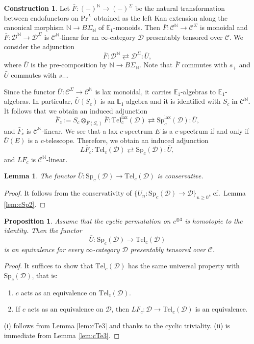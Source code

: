 \documentclass{amsart}
\theoremstyle{plain}
\newtheorem{proposition}[theorem]{Proposition}
\newtheorem{lemma}[theorem]{Lemma}
\theoremstyle{definition}
\newtheorem{construction}[theorem]{Construction}
\theoremstyle{remark}
\numberwithin{equation}{theorem}
\newcommand{\mcal}[1]{\mathcal{#1}}
\newcommand{\mbb}[1]{\mathbb{#1}}
\renewcommand{\Pr}{\mathrm{Pr}}
\newcommand{\Sp}{\mathrm{Sp}}
\newcommand{\Tel}{\mathrm{Tel}}
\newcommand{\lax}{\mathrm{lax}}
\begin{document}
\begin{construction}\label{cons:CST}
Let $\bar{F}\colon(-)^\mbb{N}\to(-)^\Sigma$ be the natural transformation between endofunctors on $\Pr^L$ obtained as the left Kan extension along the canonical morphism $\mbb{N}\to B\Sigma_\mbb{N}$ of $\mbb{E}_1$-monoids.
Then $\bar{F}\colon\mcal{C}^\mbb{N}\to\mcal{C}^\Sigma$ is monoidal and $\bar{F}\colon\mcal{D}^\mbb{N}\to\mcal{D}^\Sigma$ is $\mcal{C}^\mbb{N}$-linear for an $\infty$-category $\mcal{D}$ presentably tensored over $\mcal{C}$.
We consider the adjunction
\[
	\bar{F} \colon \mcal{D}^\mbb{N} \rightleftarrows \mcal{D}^\Sigma \colon \bar{U},
\]
where $\bar{U}$ is the pre-composition by $\mbb{N}\to B\Sigma_\mbb{N}$.
Note that $\bar{F}$ commutes with $s_+$ and $\bar{U}$ commutes with $s_-$.

Since the functor $\bar{U}\colon\mcal{C}^\Sigma\to\mcal{C}^\mbb{N}$ is lax monoidal, it carries $\mbb{E}_1$-algebras to $\mbb{E}_1$-algebras.
In particular, $\bar{U}(S_c)$ is an $\mbb{E}_1$-algebra and it is identified with $S_c$ in $\mcal{C}^\mbb{N}$.
It follows that we obtain an induced adjunction
\[
	\bar{F}_c:=S_c\otimes_{\bar{F}(S_c)}\bar{F} \colon \Tel^\lax_c(\mcal{D}) \rightleftarrows \Sp^\lax_c(\mcal{D}) \colon \bar{U},
\]
and $\bar{F}_c$ is $\mcal{C}^\mbb{N}$-linear.
We see that a lax $c$-spectrum $E$ is a $c$-spectrum if and only if $\bar{U}(E)$ is a $c$-telescope.
Therefore, we obtain an induced adjunction
\[
	L\bar{F}_c \colon \Tel_c(\mcal{D}) \rightleftarrows \Sp_c(\mcal{D}) \colon \bar{U},
\]
and $L\bar{F}_c$ is $\mcal{C}^\mbb{N}$-linear.
\end{construction}

\begin{lemma}\label{lem:CST}
The functor $\bar{U}\colon\Sp_c(\mcal{D})\to\Tel_c(\mcal{D})$ is conservative.
\end{lemma}
\begin{proof}
It follows from the conservativity of $\{U_n\colon\Sp_c(\mcal{D})\to\mcal{D}\}_{n\ge 0}$, cf.\ Lemma \ref{lem:cSp2}.
\end{proof}

\begin{proposition}\label{prop:CST}
Assume that the cyclic permutation on $c^{\otimes 3}$ is homotopic to the identity.
Then the functor
\[
	\bar{U} \colon \Sp_c(\mcal{D}) \to \Tel_c(\mcal{D})
\]
is an equivalence for every $\infty$-category $\mcal{D}$ presentably tensored over $\mcal{C}$.
\end{proposition}
\begin{proof}
It suffices to show that $\Tel_c(\mcal{D})$ has the same universal property with $\Sp_c(\mcal{D})$, that is:
\begin{enumerate}
\item $c$ acts as an equivalence on $\Tel_c(\mcal{D})$.
\item If $c$ acts as an equivalence on $\mcal{D}$, then $LF_c\colon\mcal{D}\to\Tel_c(\mcal{D})$ is an equivalence.
\end{enumerate}
(i) follows from Lemma \ref{lem:cTe3} and \cite[Proposition C.3]{BNT} thanks to the cyclic triviality.
(ii) is immediate from Lemma \ref{lem:cTe3}.
\end{proof}
\end{document}
